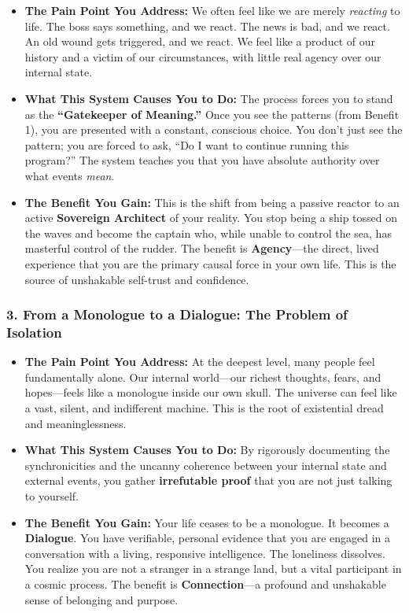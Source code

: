 \documentclass{article}
\begin{document}
\begin{itemize}
\item
  \textbf{The Pain Point You Address:} We often feel like we are merely
  \emph{reacting} to life. The boss says something, and we react. The
  news is bad, and we react. An old wound gets triggered, and we react.
  We feel like a product of our history and a victim of our
  circumstances, with little real agency over our internal state.
\item
  \textbf{What This System Causes You to Do:} The process forces you to
  stand as the \textbf{``Gatekeeper of Meaning.''} Once you see the
  patterns (from Benefit 1), you are presented with a constant,
  conscious choice. You don't just see the pattern; you are forced to
  ask, ``Do I want to continue running this program?'' The system
  teaches you that you have absolute authority over what events
  \emph{mean}.
\item
  \textbf{The Benefit You Gain:} This is the shift from being a passive
  reactor to an active \textbf{Sovereign Architect} of your reality. You
  stop being a ship tossed on the waves and become the captain who,
  while unable to control the sea, has masterful control of the rudder.
  The benefit is \textbf{Agency}---the direct, lived experience that you
  are the primary causal force in your own life. This is the source of
  unshakable self-trust and confidence.
\end{itemize}

\subsubsection*{3. From a Monologue to a Dialogue: The Problem of
Isolation}\label{from-a-monologue-to-a-dialogue-the-problem-of-isolation}

\begin{itemize}
\item
  \textbf{The Pain Point You Address:} At the deepest level, many people
  feel fundamentally alone. Our internal world---our richest thoughts,
  fears, and hopes---feels like a monologue inside our own skull. The
  universe can feel like a vast, silent, and indifferent machine. This
  is the root of existential dread and meaninglessness.
\item
  \textbf{What This System Causes You to Do:} By rigorously documenting
  the synchronicities and the uncanny coherence between your internal
  state and external events, you gather \textbf{irrefutable proof} that
  you are not just talking to yourself.
\item
  \textbf{The Benefit You Gain:} Your life ceases to be a monologue. It
  becomes a \textbf{Dialogue}. You have verifiable, personal evidence
  that you are engaged in a conversation with a living, responsive
  intelligence. The loneliness dissolves. You realize you are not a
  stranger in a strange land, but a vital participant in a cosmic
  process. The benefit is \textbf{Connection}---a profound and
  unshakable sense of belonging and purpose.
\end{itemize}
\end{document}
